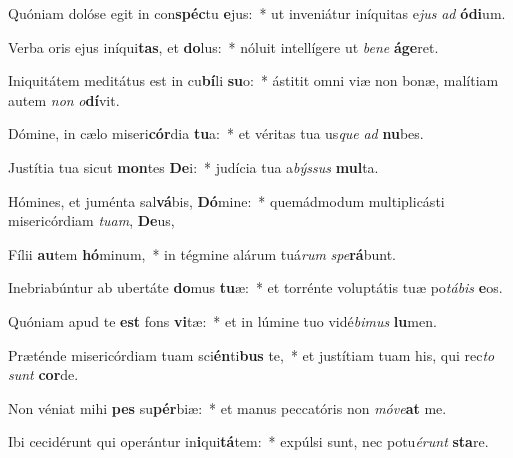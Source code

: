 \item Quóniam dolóse egit in con\textbf{spéc}tu \textbf{e}jus:~* ut inveniátur iníquitas e\textit{jus} \textit{ad} \textbf{ó}\textbf{di}um.
\item Verba oris ejus iníqui\textbf{tas}, et \textbf{do}lus:~* nóluit intellígere ut \textit{be}\textit{ne} \textbf{á}\textbf{ge}ret.
\item Iniquitátem meditátus est in cu\textbf{bí}li \textbf{su}o:~* ástitit omni viæ non bonæ, malítiam autem \textit{non} \textit{o}\textbf{dí}vit.
\item Dómine, in cælo miseri\textbf{cór}dia \textbf{tu}a:~* et véritas tua us\textit{que} \textit{ad} \textbf{nu}bes.
\item Justítia tua sicut \textbf{mon}tes \textbf{De}i:~* judícia tua a\textit{býs}\textit{sus} \textbf{mul}ta.
\item Hómines, et juménta sal\textbf{vá}bis, \textbf{Dó}mine:~* quemádmodum multiplicásti misericórdiam \textit{tu}\textit{am}, \textbf{De}us,
\item Fílii \textbf{au}tem \textbf{hó}minum,~* in tégmine alárum tuá\textit{rum} \textit{spe}\textbf{rá}bunt.
\item Inebriabúntur ab ubertáte \textbf{do}mus \textbf{tu}æ:~* et torrénte voluptátis tuæ po\textit{tá}\textit{bis} \textbf{e}os.
\item Quóniam apud te \textbf{est} fons \textbf{vi}tæ:~* et in lúmine tuo vidé\textit{bi}\textit{mus} \textbf{lu}men.
\item Præténde misericórdiam tuam sci\textbf{én}ti\textbf{bus} te,~* et justítiam tuam his, qui rec\textit{to} \textit{sunt} \textbf{cor}de.
\item Non véniat mihi \textbf{pes} su\textbf{pér}biæ:~* et manus peccatóris non \textit{mó}\textit{ve}\textbf{at} me.
\item Ibi cecidérunt qui operántur in\textbf{i}qui\textbf{tá}tem:~* expúlsi sunt, nec potu\textit{é}\textit{runt} \textbf{sta}re.
